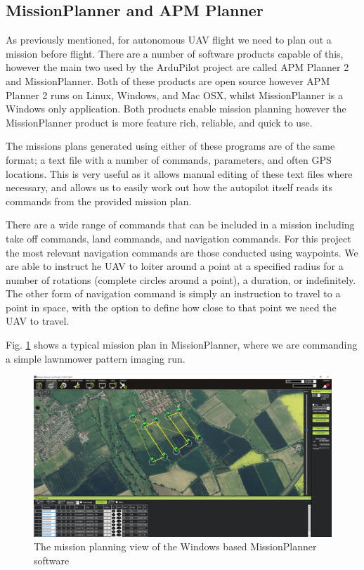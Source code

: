 \subsection{MissionPlanner and APM Planner}
\label{intro:planner}

As previously mentioned, for autonomous UAV flight we need to plan out a mission before flight. There are a number of software products capable of this, however the main two used by the ArduPilot project are called APM Planner 2 and MissionPlanner. Both of these products are open source however APM Planner 2 runs on Linux, Windows, and Mac OSX, whilst MissionPlanner is a Windows only application. Both products enable mission planning however the MissionPlanner product is more feature rich, reliable, and quick to use. 

The missions plans generated using either of these programs are of the same format; a text file with a number of commands, parameters, and often GPS locations. This is very useful as it allows manual editing of these text files where necessary, and allows us to easily work out how the autopilot itself reads its commands from the provided mission plan. 

There are a wide range of commands that can be included in a mission including take off commands, land commands, and navigation commands. For this project the most relevant navigation commands are those conducted using waypoints. We are able to instruct he UAV to loiter around a point at a specified radius for a number of rotations (complete circles around a point), a duration, or indefinitely. The other form of navigation command is simply an instruction to travel to a point in space, with the option to define how close to that point we need the UAV to travel. 

Fig. \ref{fig:missionplanner} shows a typical mission plan in MissionPlanner, where we are commanding a simple lawnmower pattern imaging run. 

\begin{figure}[htbp!] 
\centering    
\includegraphics[width=\textwidth]{MissionPlanner}
\caption[MissionPlanner Desktop Software]{The mission planning view of the Windows based MissionPlanner software}
\label{fig:missionplanner}
\end{figure}

